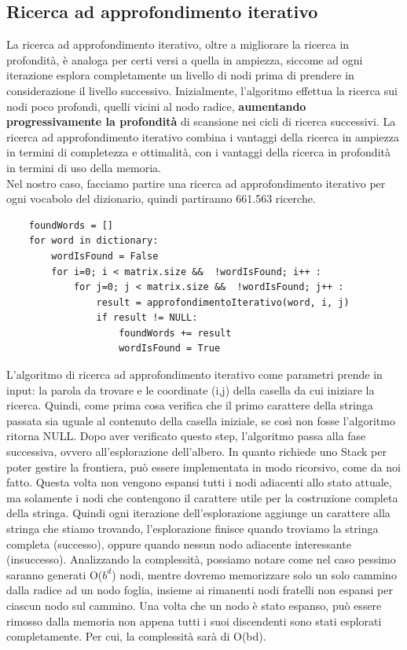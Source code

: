 \documentclass[10pt,a4paper]{article}
\begin{document}
	\subsection{Ricerca ad approfondimento iterativo}
	La ricerca ad approfondimento iterativo, oltre a migliorare la ricerca in profondità, è analoga per certi versi a quella in ampiezza, siccome ad ogni iterazione esplora completamente un livello di nodi prima di prendere in considerazione il livello successivo. Inizialmente, l'algoritmo effettua la ricerca sui nodi poco profondi, quelli vicini al nodo radice, \textbf{aumentando progressivamente la profondità} di scansione nei cicli di ricerca successivi. La ricerca ad approfondimento iterativo combina i vantaggi della ricerca in ampiezza in termini di completezza e ottimalità, con i vantaggi della ricerca in profondità in termini di uso della memoria.\\
	Nel nostro caso, facciamo partire una ricerca ad approfondimento iterativo per ogni vocabolo del dizionario, quindi partiranno 661.563 ricerche.
	\begin{lstlisting}
	foundWords = []
	for word in dictionary:
		wordIsFound = False
		for i=0; i < matrix.size &&  !wordIsFound; i++ :
			for j=0; j < matrix.size &&  !wordIsFound; j++ :
				result = approfondimentoIterativo(word, i, j)
				if result != NULL:
					foundWords += result
					wordIsFound = True
	\end{lstlisting}
	L'algoritmo di ricerca ad approfondimento iterativo come parametri prende in input: la parola da trovare e le coordinate (i,j) della casella da cui iniziare la ricerca. Quindi, come prima cosa verifica che il primo carattere della stringa passata sia uguale al contenuto della casella iniziale, se così non fosse l'algoritmo ritorna NULL.
	Dopo aver verificato questo step, l'algoritmo passa alla fase successiva, ovvero all'esplorazione dell'albero. In quanto richiede uno Stack per poter gestire la frontiera, può essere implementata in modo ricorsivo, come da noi fatto. Questa volta non vengono espansi tutti i nodi adiacenti allo stato attuale, ma solamente i nodi che contengono il carattere utile per la costruzione completa della stringa. Quindi ogni iterazione dell'esplorazione aggiunge un carattere alla stringa che stiamo trovando, l'esplorazione finisce quando troviamo la stringa completa (successo), oppure quando nessun nodo adiacente interessante (insuccesso).
	Analizzando la complessità, possiamo notare come nel caso pessimo saranno generati O($b^d$) nodi, mentre dovremo memorizzare solo un solo cammino dalla radice ad un nodo foglia, insieme ai rimanenti nodi fratelli non espansi per ciascun nodo sul cammino. Una volta che un nodo è stato espanso, può essere rimosso dalla memoria non appena tutti i suoi discendenti	sono stati esplorati completamente. Per cui, la complessità sarà di O(bd).
\end{document}
